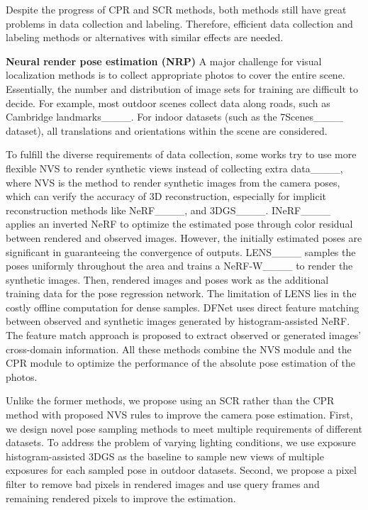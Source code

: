 Despite the progress of CPR and SCR methods, both methods still have great problems in data collection and labeling. Therefore, efficient data collection and labeling methods or alternatives with similar effects are needed.

\textbf{Neural render pose estimation (NRP)}
A major challenge for visual localization methods is to collect appropriate photos to cover the entire scene. Essentially, the number and distribution of image sets for training are difficult to decide.
For example, most outdoor scenes collect data along roads, such as Cambridge landmarks____. For indoor datasets (such as the 7Scenes____ dataset), all translations and orientations within the scene are considered.

To fulfill the diverse requirements of data collection, some works try to use more flexible NVS to render synthetic views instead of collecting extra data____, where NVS is the method to render synthetic images from the camera poses, which can verify the accuracy of 3D reconstruction, especially for implicit reconstruction methods like NeRF____, and 3DGS____.
INeRF____ applies an inverted NeRF to optimize the estimated pose through color residual between rendered and observed images. However, the initially estimated poses are significant in guaranteeing the convergence of outputs.
LENS____ samples the poses uniformly throughout the area and trains a NeRF-W____ to render the synthetic images. Then, rendered images and poses work as the additional training data for the pose regression network. The limitation of LENS lies in the costly offline computation for dense samples. DFNet uses direct feature matching between observed and synthetic images generated by histogram-assisted NeRF. The feature match approach is proposed to extract observed or generated images' cross-domain information. All these methods combine the NVS module and the CPR module to optimize the performance of the absolute pose estimation of the photos.

Unlike the former methods, we propose using an SCR rather than the CPR method with proposed NVS rules to improve the camera pose estimation.
First, we design novel pose sampling methods to meet multiple requirements of different datasets. To address the problem of varying lighting conditions, we use exposure histogram-assisted 3DGS as the baseline to sample new views of multiple exposures for each sampled pose in outdoor datasets.
Second, we propose a pixel filter to remove bad pixels in rendered images and use query frames and remaining rendered pixels to improve the estimation.

